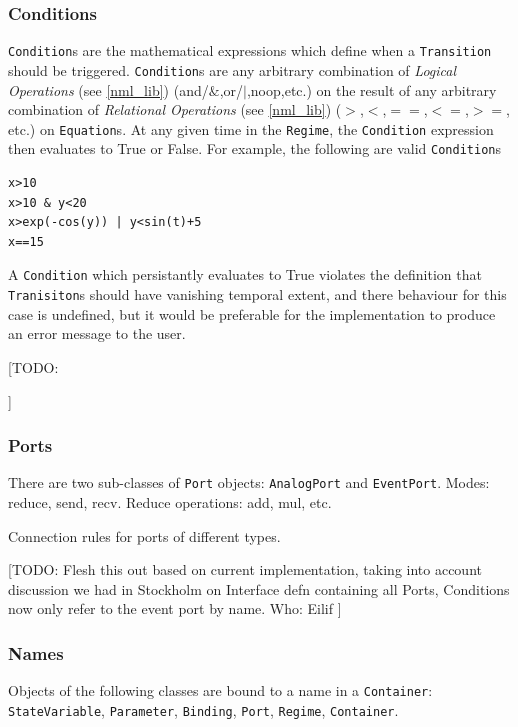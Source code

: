\documentclass[a4paper]{article}
\newcommand\nmlClass[1]{{\tt #1}}
\begin{document}
\subsubsection{Conditions}

\nmlClass{Condition}s are the mathematical expressions which define
when a \nmlClass{Transition} should be triggered.
\nmlClass{Condition}s are any arbitrary combination of \emph{Logical
  Operations} (see \ref{nml_lib}) (and/$\&$,or/$|$,noop,etc.) on the
result of any arbitrary combination of \emph{Relational Operations}
(see \ref{nml_lib}) ($>$,$<$,$==$,$<=$,$>=$, etc.) on \nmlClass{Equation}s.  At
any given time in the \nmlClass{Regime}, the \nmlClass{Condition}
expression then evaluates to True or False.  For example, the
following are valid \nmlClass{Condition}s

\begin{lstlisting}[style=display]
x>10
x>10 & y<20
x>exp(-cos(y)) | y<sin(t)+5
x==15
\end{lstlisting}

A \nmlClass{Condition} which persistantly evaluates to True
violates the definition that \nmlClass{Tranisiton}s should have vanishing
temporal extent, and there behaviour for this case is undefined, but
it would be preferable for the implementation to produce an error
message to the user.

[TODO:


]


\subsubsection{Ports}

There are two sub-classes of \nmlClass{Port} objects: \nmlClass{AnalogPort} and \nmlClass{EventPort}.
Modes: reduce, send, recv.  
Reduce operations: add, mul, etc.

Connection rules for ports of different types.

[TODO:
Flesh this out based on current implementation, taking into account
discussion we had in Stockholm on Interface defn containing all Ports,
Conditions now only refer to the event port by name.
Who: Eilif
]


\subsubsection{Names}

Objects of the following classes are bound to a name in a \nmlClass{Container}:
\nmlClass{StateVariable}, \nmlClass{Parameter}, \nmlClass{Binding},
\nmlClass{Port}, \nmlClass{Regime}, \nmlClass{Container}.
\end{document}
